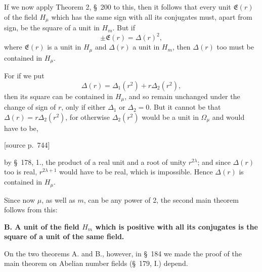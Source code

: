 \documentclass[11pt]{article}
\newcommand{\srcpage}[1]{\par\medskip\noindent\textsf{[source p.~#1]}\par\smallskip}
\begin{document}
If we now apply Theorem 2, \S~200 to this, then it follows that every unit $\mathfrak E(r)$ of the field $H_\mu$ which has the same sign with all its conjugates must, apart from sign, be the square of a unit in $H_m$. But if
\[
\pm\mathfrak E(r)=\Delta(r)^2,
\]
where $\mathfrak E(r)$ is a unit in $H_\mu$ and $\Delta(r)$ a unit in $H_m$, then $\Delta(r)$ too must be contained in $H_\mu$.

For if we put
\[
\Delta(r)=\Delta_1(r^2)+r\Delta_2(r^2),
\]
then its square can be contained in $H_\mu$, and so remain unchanged under the change of sign of $r$, only if either $\Delta_1$ or $\Delta_2=0$. But it cannot be that $\Delta(r)=r\Delta_2(r^2)$, for otherwise $\Delta_2(r^2)$ would be a unit in $\Omega_\mu$ and would have to be,
\srcpage{744}
by \S~178, 1., the product of a real unit and a root of unity $r^{2\lambda}$; and since $\Delta(r)$ too is real, $r^{2\lambda+1}$ would have to be real, which is impossible. Hence $\Delta(r)$ is contained in $H_\mu$.

Since now $\mu$, as well as $m$, can be any power of 2, the second main theorem follows from this:

\begin{center}\textbf{B. A unit of the field $H_m$ which is positive with all its conjugates is the square of a unit of the same field.}\end{center}

On the two theorems A. and B., however, in \S~184 we made the proof of the main theorem on Abelian number fields (\S~179, I.) depend.
\end{document}
